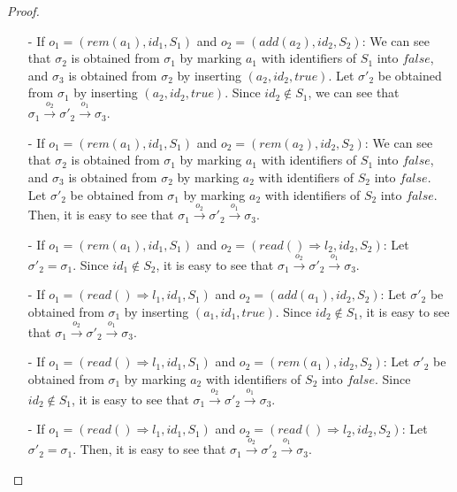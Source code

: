 {\begin {proof}
\begin{itemize}
\begin{itemize}
    \item[-] If $o_1 = (\mathit{rem}(a_1),\mathit{id}_1,S_1)$ and $o_2 = (\mathit{add}(a_2),\mathit{id}_2,S_2)$: We can see that $\sigma_2$ is obtained from $\sigma_1$ by marking $a_1$ with identifiers of $S_1$ into $\mathit{false}$, and $\sigma_3$ is obtained from $\sigma_2$ by inserting $(a_2,\mathit{id}_2,\mathit{true})$. Let $\sigma'_2$ be obtained from $\sigma_1$ by inserting $(a_2,\mathit{id}_2,\mathit{true})$. Since $\mathit{id}_2 \notin S_1$, we can see that $\sigma_1 {\xrightarrow{o_2}} \sigma'_2 {\xrightarrow{o_1}} \sigma_3$.

    \item[-] If $o_1 = (\mathit{rem}(a_1),\mathit{id}_1,S_1)$ and $o_2 = (\mathit{rem}(a_2),\mathit{id}_2,S_2)$: We can see that $\sigma_2$ is obtained from $\sigma_1$ by marking $a_1$ with identifiers of $S_1$ into $\mathit{false}$, and $\sigma_3$ is obtained from $\sigma_2$ by marking $a_2$ with identifiers of $S_2$ into $\mathit{false}$. Let $\sigma'_2$ be obtained from $\sigma_1$ by marking $a_2$ with identifiers of $S_2$ into $\mathit{false}$. Then, it is easy to see that $\sigma_1 {\xrightarrow{o_2}} \sigma'_2 {\xrightarrow{o_1}} \sigma_3$.

    \item[-] If $o_1 = (\mathit{rem}(a_1),\mathit{id}_1,S_1)$ and $o_2 = (\mathit{read}() \Rightarrow l_2,\mathit{id}_2,S_2)$: Let $\sigma'_2 = \sigma_1$. Since $\mathit{id}_1 \notin S_2$, it is easy to see that $\sigma_1 {\xrightarrow{o_2}} \sigma'_2 {\xrightarrow{o_1}} \sigma_3$.

    \item[-] If $o_1 = (\mathit{read}() \Rightarrow l_1,\mathit{id}_1,S_1)$ and $o_2 = (\mathit{add}(a_1),\mathit{id}_2,S_2)$: Let $\sigma'_2$ be obtained from $\sigma_1$ by inserting $(a_1,\mathit{id}_1,\mathit{true})$. Since $\mathit{id}_2 \notin S_1$, it is easy to see that $\sigma_1 {\xrightarrow{o_2}} \sigma'_2 {\xrightarrow{o_1}} \sigma_3$.

    \item[-] If $o_1 = (\mathit{read}() \Rightarrow l_1,\mathit{id}_1,S_1)$ and $o_2 = (\mathit{rem}(a_1),\mathit{id}_2,S_2)$: Let $\sigma'_2$ be obtained from $\sigma_1$ by marking $a_2$ with identifiers of $S_2$ into $\mathit{false}$. Since $\mathit{id}_2 \notin S_1$, it is easy to see that $\sigma_1 {\xrightarrow{o_2}} \sigma'_2 {\xrightarrow{o_1}} \sigma_3$.

    \item[-] If $o_1 = (\mathit{read}() \Rightarrow l_1,\mathit{id}_1,S_1)$ and $o_2 = (\mathit{read}() \Rightarrow l_2,\mathit{id}_2,S_2)$: Let $\sigma'_2 = \sigma_1$. Then, it is easy to see that $\sigma_1 {\xrightarrow{o_2}} \sigma'_2 {\xrightarrow{o_1}} \sigma_3$.
    \end{itemize}
\end{itemize}


\end{proof}}
